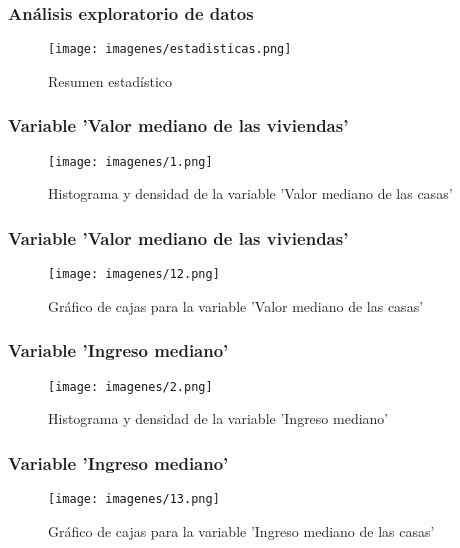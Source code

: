 \documentclass[12pt]{beamer}
\begin{document}
\begin{frame}
\frametitle{Análisis exploratorio de datos}
\begin{figure}[!h]
    \begin{center}
        \texttt{[image: imagenes/estadisticas.png]}
        \caption{Resumen estadístico}
        \label{fig:Densidad}
    \end{center}
\end{figure}

\end{frame}
\begin{frame}
\frametitle{Variable 'Valor mediano de las viviendas'}
\begin{figure}[!h]
    \begin{center}
        \texttt{[image: imagenes/1.png]}
        \caption{Histograma y densidad de la variable 'Valor mediano de las casas'}
        \label{fig:Densidad}
    \end{center}
\end{figure}
\end{frame}
\begin{frame}
\frametitle{Variable 'Valor mediano de las viviendas'}
\begin{figure}[!h]
    \begin{center}
        \texttt{[image: imagenes/12.png]}
        \caption{Gráfico de cajas para la variable 'Valor mediano de las casas'}
        \label{fig:Densidad}
    \end{center}
\end{figure}
\end{frame}

\begin{frame}
\frametitle{Variable 'Ingreso mediano'}
\begin{figure}[!h]
    \begin{center}
        \texttt{[image: imagenes/2.png]}
        \caption{Histograma y densidad de la variable 'Ingreso mediano'}
        \label{fig:Densidad}
    \end{center}
\end{figure}
\end{frame}
\begin{frame}
\frametitle{Variable 'Ingreso mediano'}
\begin{figure}[!h]
    \begin{center}
        \texttt{[image: imagenes/13.png]}
        \caption{Gráfico de cajas para la variable 'Ingreso mediano de las casas'}
        \label{fig:Densidad}
    \end{center}
\end{figure}
\end{frame}
\end{document}
